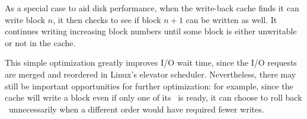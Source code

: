 As a special case to aid disk performance, when the write-back cache finds
it can write block $n$, it then checks to see if block $n+1$ can be written as
well.
%
It continues writing increasing block numbers until some block is either
unwritable or not in the cache.
%
\begin{comment}
The block itself is also marked \PInfst, so that only
one version of its data will be in flight at a time. (This whole procedure is
basically the buffer cache \textit{Write block} action.)
\end{comment}
%
This simple optimization greatly improves I/O wait time, since the I/O
requests are merged and reordered in Linux's elevator scheduler.
%
Nevertheless, there may still be important opportunities for further
optimization: for example, since the cache will write a block even if only
one of its \patches\ is ready, it can choose to roll back \patches\
unnecessarily when a different order would have required fewer writes.


\begin{comment}
Each \patch\ on a cached block may or may not be visible to a given \module.
For example, \modules\ that respond to user requests generally view the most
current state of every block -- the block with all \patches\ applied. However, a
write-back cache may choose to write some \patches\ on a block while reverting
others, since those others currently have outstanding dependencies. In this
case, \modules\ below the write-back cache (i.e. closer to the disk) should view
those \patches\ in the reverted state. \Kudos\ provides a block revisioning
library function that automatically rolls back those \patches\ that should not
be visible at a particular \module, and then rolls them forward again after that
\module\ is done with the block.
\end{comment}
